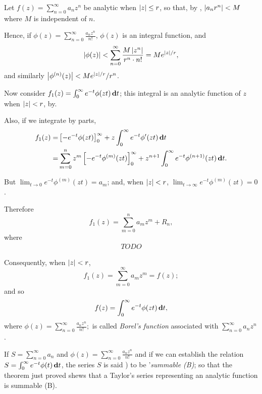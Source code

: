 Let $f(z) = \sum_{n=0}^{\infty} a_{n} z^{n}$ be analytic when
$\left| z \right| \leq r$, so that, by
,
$\left|  a_{n} r^{n}  \right| < M$
where $M$ is independent of $n$.

Hence, if
$\phi(z) = \sum_{n=0}^{\infty} \frac{a_{n} z^{n}}{n!}$,
$\phi(z)$ is an integral function, and
$$
\left|  \phi(z)  \right|
<
\sum_{n=0}^{\infty} \frac{M \left| z^{n} \right| }{ r^{n} \cdot n!}
=
M e^{\left| z \right|/r},
$$
and similarly
$\left|  \phi^{(n)}(z)  \right| < M e^{\left| z \right|/r}/r^{n}$.

Now consider
$f_{1}(z) = \int_{0}^{\infty} e^{-t} \phi(zt) \, \mathbf{d} t$;
this integral is an analytic function
of $z$ when $\left| z \right| < r$, by.

Also, if we integrate by parts,
\begin{align*}
  f_{1}(z)
  =&
  \left[ - e^{-t} \phi(zt)  \right]_{0}^{\infty}
  +
  z \int_{0}^{\infty} e^{-t} \phi'(zt) \, \mathbf{d} t
  \\
  =&
  \sum_{m=0}^{n}
  z^{m}
  \left[  - e^{-t} \phi^{(m)}(zt)  \right]_{0}^{\infty}
  +
  z^{n+1}
  \int_{0}^{\infty}
  e^{-t} \phi^{(n+1)}(zt) \, \mathbf{d} t.
\end{align*}

But $\lim_{t \rightarrow 0} e^{-t} \phi^{(m)}(zt) = a_{m}$; and,
when $\left| z \right| < r$,
$\lim_{t \rightarrow \infty} e^{-t} \phi^{(m)}(zt) = 0$.

Therefore
$$
f_{1}(z) = \sum_{m=0}^{n} a_{m} z^{m} + R_{n},
$$
%
%
where
\begin{align*}
  TODO
\end{align*}

Consequently, when $\left| z \right| < r$,
$$
f_{1}(z) = \sum_{m=0}^{\infty} a_{m} z^{m} = f(z);
$$
and so
$$
f(z) = \int_{0}^{\infty} e^{-t} \phi(zt) \, \mathbf{d} t,
$$
where
$
\phi(z) = \sum_{n=0}^{\infty} \frac{a_{n} z^{n}}{n!};
$
is called \emph{Borel's function} associated with
$\sum_{n=0}^{\infty} a_{n} z^{n}$.

If
$S = \sum_{n=0}^{\infty} a_{n}$
and
$\phi(z) = \sum_{n=0}^{\infty} \frac{a_{n} z^{n}}{n!}$
and if we can establish the relation
$S = \int_{0}^{\infty} e^{-t} \phi(t) \, \mathbf{d} t$,
the series $S$ is said ) to be
'\emph{summable (B)}; so that the
theorem just proved shews that a Taylor's series representing an
analytic function is summable (B).


